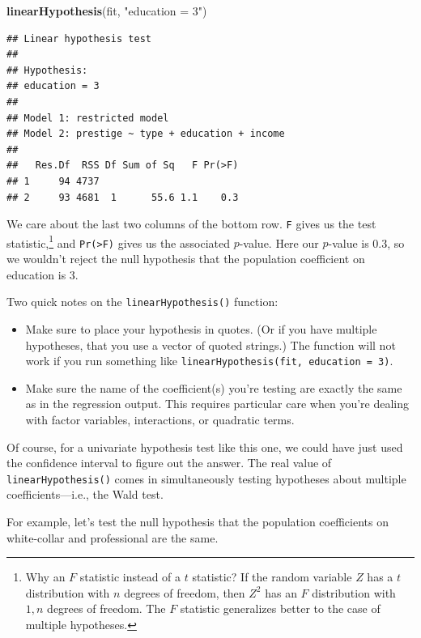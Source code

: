 \documentclass[12pt,oneside,openany]{book}
\newenvironment{Shaded}{\begin{snugshade}}{\end{snugshade}}
\newcommand{\KeywordTok}[1]{\textcolor[rgb]{0.13,0.29,0.53}{\textbf{{#1}}}}
\newcommand{\StringTok}[1]{\textcolor[rgb]{0.31,0.60,0.02}{{#1}}}
\newcommand{\NormalTok}[1]{{#1}}
\let\rmarkdownfootnote\footnote%
\def\footnote{\protect\rmarkdownfootnote}
\begin{document}
\begin{Shaded}
\begin{Highlighting}[]
\KeywordTok{linearHypothesis}\NormalTok{(fit, }\StringTok{"education = 3"}\NormalTok{)}
\end{Highlighting}
\end{Shaded}

\begin{verbatim}
## Linear hypothesis test
## 
## Hypothesis:
## education = 3
## 
## Model 1: restricted model
## Model 2: prestige ~ type + education + income
## 
##   Res.Df  RSS Df Sum of Sq   F Pr(>F)
## 1     94 4737                        
## 2     93 4681  1      55.6 1.1    0.3
\end{verbatim}

We care about the last two columns of the bottom row. \texttt{F} gives
us the test statistic,\footnote{Why an \(F\) statistic instead of a
  \(t\) statistic? If the random variable \(Z\) has a \(t\) distribution
  with \(n\) degrees of freedom, then \(Z^2\) has an \(F\) distribution
  with \(1,n\) degrees of freedom. The \(F\) statistic generalizes
  better to the case of multiple hypotheses.} and
\texttt{Pr(\textgreater{}F)} gives us the associated \(p\)-value. Here
our \(p\)-value is 0.3, so we wouldn't reject the null hypothesis that
the population coefficient on education is 3.

Two quick notes on the \texttt{linearHypothesis()} function:

\begin{itemize}
\item
  Make sure to place your hypothesis in quotes. (Or if you have multiple
  hypotheses, that you use a vector of quoted strings.) The function
  will not work if you run something like
  \texttt{linearHypothesis(fit,\ education\ =\ 3)}.
\item
  Make sure the name of the coefficient(s) you're testing are exactly
  the same as in the regression output. This requires particular care
  when you're dealing with factor variables, interactions, or quadratic
  terms.
\end{itemize}

Of course, for a univariate hypothesis test like this one, we could have
just used the confidence interval to figure out the answer. The real
value of \texttt{linearHypothesis()} comes in simultaneously testing
hypotheses about multiple coefficients---i.e., the Wald test.

For example, let's test the null hypothesis that the population
coefficients on white-collar and professional are the same.
\end{document}
